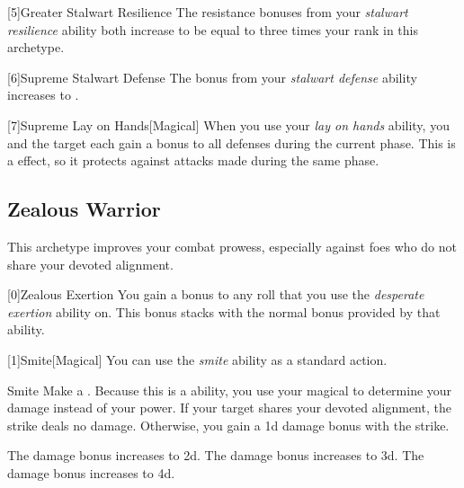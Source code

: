         [5]{Greater Stalwart Resilience} The resistance bonuses from your \textit{stalwart resilience} ability both increase to be equal to three times your rank in this archetype.

        [6]{Supreme Stalwart Defense} The bonus from your \textit{stalwart defense} ability increases to .

        [7]{Supreme Lay on Hands}[Magical] When you use your \textit{lay on hands} ability, you and the target each gain a  bonus to all defenses during the current phase.
        This is a  effect, so it protects against attacks made during the same phase.

    \newpage
    \subsection{Zealous Warrior}
        This archetype improves your combat prowess, especially against foes who do not share your devoted alignment.

        [0]{Zealous Exertion} You gain a  bonus to any roll that you use the \textit{desperate exertion} ability on.
        This bonus stacks with the normal  bonus provided by that ability.

        [1]{Smite}[Magical] You can use the \textit{smite} ability as a standard action.
        \begin{instantability}{Smite}
            \rankline
            Make a .
            Because this is a  ability, you use your magical  to determine your damage instead of your  power.
            If your target shares your devoted alignment, the strike deals no damage.
            Otherwise, you gain a \plus1d damage bonus with the strike.

            \rankline
             The damage bonus increases to \plus2d.
             The damage bonus increases to \plus3d.
             The damage bonus increases to \plus4d.
        \end{instantability}

